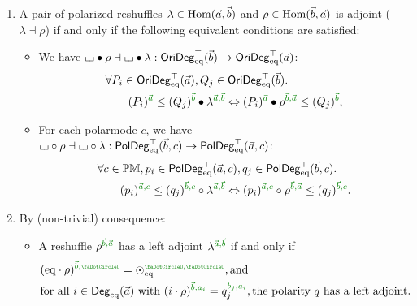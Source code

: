 \documentclass[a4paper]{memoir}
\begin{document}
\begin{theorem}\label{thm:poresh-adjoint}
	\begin{enumerate}
		\item A pair of polarized reshuffles $\lambda \in {\mathrm{Hom}}(\vec a, \vec b)$ and $\rho \in {\mathrm{Hom}}(\vec b, \vec a)$ is adjoint ($\lambda \dashv \rho$) if and only if the following equivalent conditions are satisfied:
		\begin{itemize}
			\item We have ${\llcorner\hspace{-.4ex}\lrcorner} \mathbin{\bullet} \rho \dashv {\llcorner\hspace{-.4ex}\lrcorner} \mathbin{\bullet} \lambda : \mathsf{OriDeg}_{\mathrm{eq}}^\top(\vec b) \to \mathsf{OriDeg}_{\mathrm{eq}}^\top(\vec a)$:
			\begin{align}
				&\forall P_i \in \oridegeqtop(\vec a), Q_j \in \oridegeqtop(\vec b). \nn \\
				&\qquad (P_i)\pmr{\vec a} \leq (Q_j)\pmr{\vec b} \oriof \lambda \pmrhom{\vec a}{\vec b} \Leftrightarrow (P_i)\pmr{\vec a} \oriof \rho\pmrhom{\vec b}{\vec a} \leq (Q_j)\pmr{\vec b},
				\label{eq:poresh-adjoint-crit-orideg}
			\end{align}
			\item For each polarmode $c$, we have ${\llcorner\hspace{-.4ex}\lrcorner} \circ \rho \dashv {\llcorner\hspace{-.4ex}\lrcorner} \circ \lambda : \mathsf{PolDeg}_{\mathrm{eq}}^\top(\vec b, c) \to \mathsf{PolDeg}_{\mathrm{eq}}^\top(\vec a, c)$:
			\begin{align}
				&\forall c \in \Polarmode, p_i \in \poldegeqtop(\vec a, c), q_j \in \poldegeqtop(\vec b, c). \nn \\
				&\qquad (p_i)\pmrhom{\vec a}{c} \leq (q_j)\pmrhom{\vec b}{c} \circ \lambda\pmrhom{\vec a}{\vec b} \Leftrightarrow (p_i)\pmrhom{\vec a}{c} \circ \rho\pmrhom{\vec b}{\vec a} \leq (q_j)\pmrhom{\vec b}{c}.
				\label{eq:poresh-adjoint-crit-poldeg}
			\end{align}
		\end{itemize}
		\item By (non-trivial) consequence:
		\begin{itemize}
			\item A reshuffle $\rho\pmrhom{\vec b}{\vec a}$ has a left adjoint $\lambda\pmrhom{\vec a}{\vec b}$ if and only if
			\begin{align}
				&(\eqtydeg \cdot \rho)\pmrhom{\vec b}{\npolar} = \nonpol_\eqtydeg \pmrnn, \text{and} \label{eq:poresh-withl-crit1} \\
				&\text{for all } i \in \Degeq(\vec a) \text{ with } (i \cdot \rho)\pmrhom{\vec b}{a_i} = q_j\pmrhom{b_j}{a_i}, \text{the polarity $q$ has a left adjoint.}

\end{align}
\end{itemize}
\end{enumerate}
\end{theorem}
\end{document}
